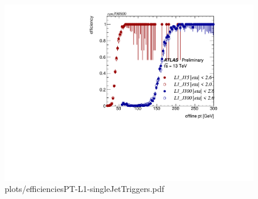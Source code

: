 \documentclass{beamer}
\begin{document}
\begin{frame}
    \begin{figure}[h]
      \centering
      \includegraphics[scale=0.50]{plots/efficienciesPT-L1-singleJetTriggers.pdf}
      \caption{plots/efficienciesPT-L1-singleJetTriggers.pdf}
      \label{img:1}
    \end{figure}
\end{frame}
\end{document}

